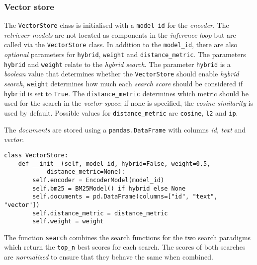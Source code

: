 \documentclass{article}
\begin{document}
\subsubsection{Vector store}
The \colorbox{lightgray!25}{\lstinline{VectorStore}} class is initialised with a \colorbox{lightgray!25}{\lstinline{model_id}} for the \textit{encoder}. The \textit{retriever models} are not located as components in the \textit{inference loop} but are called via the \colorbox{lightgray!25}{\lstinline{VectorStore}} class. In addition to the \colorbox{lightgray!25}{\lstinline{model_id}}, there are also \textit{optional} parameters for \colorbox{lightgray!25}{\lstinline{hybrid}}, \colorbox{lightgray!25}{\lstinline{weight}} and \colorbox{lightgray!25}{\lstinline{distance_metric}}. The parameters \colorbox{lightgray!25}{\lstinline{hybrid}} and \colorbox{lightgray!25}{\lstinline{weight}} relate to the \textit{hybrid search}. The parameter \colorbox{lightgray!25}{\lstinline{hybrid}} is a \textit{boolean} value that determines whether the \colorbox{lightgray!25}{\lstinline{VectorStore}} should enable \textit{hybrid search}, \colorbox{lightgray!25}{\lstinline{weight}} determines how much each \textit{search score} should be considered if \colorbox{lightgray!25}{\lstinline{hybrid}} is set to \colorbox{lightgray!25}{\lstinline{True}}. The \colorbox{lightgray!25}{\lstinline{distance_metric}} determines which metric should be used for the search in the \textit{vector space}; if none is specified, the \textit{cosine similarity} is used by default. Possible values for \colorbox{lightgray!25}{\lstinline{distance_metric}} are \colorbox{lightgray!25}{\lstinline{cosine}}, \colorbox{lightgray!25}{\lstinline{l2}} and \colorbox{lightgray!25}{\lstinline{ip}}.

The \textit{documents} are stored using a \colorbox{lightgray!25}{\lstinline{pandas.DataFrame}} with columns \textit{id}, \textit{text} and \textit{vector}.

\begin{lstlisting}[backgroundcolor = \color{lightgray!25}]
class VectorStore:
    def __init__(self, model_id, hybrid=False, weight=0.5, 
            distance_metric=None):
        self.encoder = EncoderModel(model_id)
        self.bm25 = BM25Model() if hybrid else None
        self.documents = pd.DataFrame(columns=["id", "text", "vector"])
        self.distance_metric = distance_metric
        self.weight = weight
\end{lstlisting}

The function \colorbox{lightgray!25}{\lstinline{search}} combines the search functions for the two search paradigms which return the \colorbox{lightgray!25}{\lstinline{top_n}} best scores for each search. The scores of both searches are \textit{normalized} to ensure that they behave the same when combined. 
\end{document}
